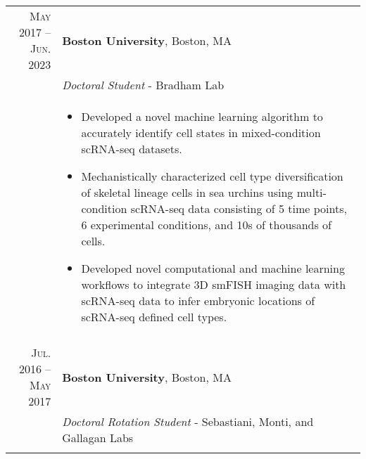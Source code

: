 \documentclass[a4paper,10pt]{report}
\begin{document}
\section{\color{linkcolour}{Recent Professional History}}
\begin{longtable}{r|p{10.5cm}}
	\textsc{May 2017 -- Jun. 2023}  & \textbf{Boston University}, Boston, MA                                         \\
	                                & \small \emph{Doctoral Student} - Bradham Lab                                   \\
	                                & \footnotesize{
		\vspace{-3.5mm}
		\begin{itemize}
			\setlength\itemsep{0em}
			\item Developed a novel machine learning algorithm to accurately identify cell states in mixed-condition scRNA-seq datasets.
			\item Mechanistically characterized cell type diversification of skeletal lineage cells in sea urchins using multi-condition scRNA-seq data consisting of 5 time points, 6 experimental conditions, and 10s of thousands of cells.
			\item Developed novel computational and machine learning workflows to integrate 3D smFISH imaging data with scRNA-seq data to infer embryonic locations of scRNA-seq defined cell types.
		\end{itemize}
	} \vspace{-3.5mm}                                                                                                \\
	\multicolumn{2}{c}{}                                                                                             \\[-0.75em]
	\textsc{Jul. 2016 -- May 2017}  & \textbf{Boston University}, Boston, MA                                         \\
	                                & \small \emph{Doctoral Rotation Student} - Sebastiani, Monti, and Gallagan Labs \\
	                                & \footnotesize{
		\vspace{-3.5mm}
		\begin{itemize}
			\setlength\itemsep{0em}

\end{itemize}}
\end{longtable}
\end{document}
